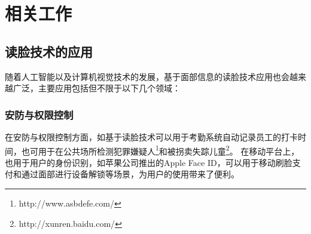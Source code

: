 \chapter{相关工作}

\section{读脸技术的应用}

随着人工智能以及计算机视觉技术的发展，基于面部信息的读脸技术应用也会越来越广泛，主要应用包括但不限于以下几个领域：

\subsection{安防与权限控制}
在安防与权限控制方面，如基于读脸技术可以用于考勤系统自动记录员工的打卡时间\cite{patel2014development}，也可用于在公共场所检测犯罪嫌疑人\footnote{http://www.asbdefe.com/}和被拐卖失踪儿童\footnote{http://xunren.baidu.com/}。
在移动平台上，也用于用户的身份识别，如苹果公司推出的Apple Face ID，可以用于移动刷脸支付和通过面部进行设备解锁等场景，为用户的使用带来了便利。

